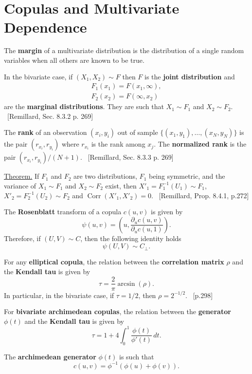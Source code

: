 \documentclass[10pt]{article}
\DeclareMathOperator{\Corr}{Corr}
\newcommand{\reff}[1]{\mbox{}~\hfill \footnotesize{[#1]}\normalsize}
\begin{document}
\section{Copulas and Multivariate Dependence}
\begin{outline}

\1 The \textbf{margin} of a multivariate distribution is the distribution of a single
random variables when all others are known to be true. 

\1 In the bivariate case, if $(X_1,X_2)\sim F$ then $F$ is the \textbf{joint distribution}
and 
\begin{gather*}
F_1(x_1) = F(x_1,\infty),\\
F_2(x_2) = F(\infty,x_2)  
\end{gather*}
are the \textbf{marginal distributions}. They are such that $X_1\sim F_1$ and $X_2\sim
F_2$.
\reff{Remillard, Sec. 8.3.2 p. 269}

\1 The \textbf{rank} of an observation $(x_i,y_i)$ out of sample
$\{(x_1,y_1),\dots,(x_N,y_N)\}$ is the pair $(r_{x_i},r_{y_i})$ where $r_{x_i}$ is the
rank among $x_j$. The \textbf{normalized rank} is the pair $(r_{x_i},r_{y_i})/(N+1)$.
\reff{Remillard, Sec. 8.3.3 p. 269}

\1 \underline{Theorem.} If $F_1$ and $F_2$ are two distributions, $F_1$ being symmetric,
and the variance of $X_1\sim F_1$ and $X_2\sim F_2$ exist, then $X'_1=F_1^{-1}(U_1)\sim
F_1$, $X'_2=F_2^{-1}(U_2)\sim F_2$ and $\Corr(X'_1,X'_2)=0$.
\reff{Remillard, Prop. 8.4.1, p.272}

\1 The \textbf{Rosenblatt} transform of a copula $c(u,v)$ is given by
\begin{equation*}
  \psi(u,v) = \left(u,\frac{\partial_u c(u,v)}{\partial_u c(u,1)}\right).
\end{equation*}
Therefore, if $(U,V)\sim C$, then the following identity holds
\begin{equation*}
  \psi(U,V) \sim C_\perp.
\end{equation*}

\1 For any \textbf{elliptical copula}, the relation between the \textbf{correlation
  matrix} $\rho$ and the \textbf{Kendall tau} is given by
\begin{equation*}
  \tau = \frac{2}{\pi}\arcsin(\rho).
\end{equation*}
In particular, in the bivariate case, if $\tau=1/2$, then $\rho=2^{-1/2}$.
\reff{p.298}

\1 For \textbf{bivariate archimedean copulas}, the relation between the \textbf{generator}
$\phi(t)$ and the \textbf{Kendall tau} is given by
\begin{equation*}
  \tau = 1 + 4\int_0^1\frac{\phi(t)}{\phi'(t)}\,dt.
\end{equation*}

\1 The \textbf{archimedean generator} $\phi(t)$ is such that
\begin{equation*}
  c(u,v) = \phi^{-1}(\phi(u) + \phi(v)).
\end{equation*}
\end{outline}
\end{document}
